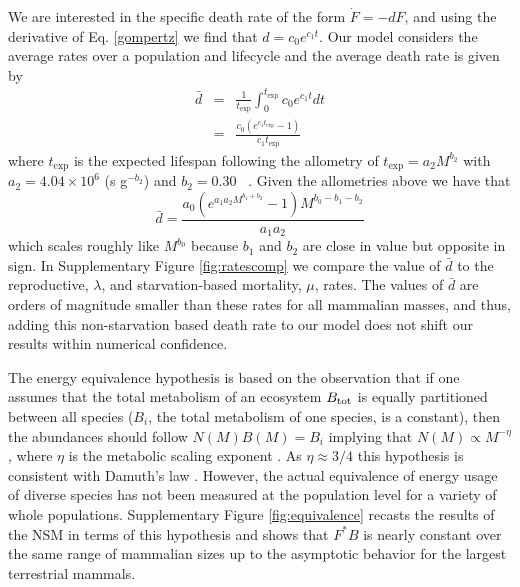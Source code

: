 \documentclass[onecolumn,preprintnumbers,amsmath,amssymb,superscriptaddress]{revtex4}
\begin{document}
We are interested in the specific death rate of the form $\dot{F}=-dF$, and using the derivative of Eq. \ref{gompertz} we find that $d=c_{0}e^{c_{1}t}$. Our model considers the average rates over a population and lifecycle and the average death rate is given by 
\begin{eqnarray}
\bar{d}&=&\frac{1}{t_{\text{exp}}}\int_{0}^{t_{\text{exp}}}c_{0}e^{c_{1}t} dt \\
&=&\frac{c_{0}\left(e^{c_{1} t_{\text{exp}}}-1\right)}{c_{1}t_{\text{exp}}}
\end{eqnarray}
where $t_{\text{exp}}$ is the expected lifespan following the allometry of $t_{\text{exp}}=a_{2}M^{b_{2}}$ with $a_{2}=4.04\times10^{6}$ (s g$^{-b_{2}}$) and $b_{2}=0.30$ ~\citep{damuth1982analysis,calder1984}. Given the allometries above we have that
\begin{equation}
\bar{d}=\frac{a_{0} \left(e^{a_{1}a_{2}M^{b_{1}+b_{2}}}-1\right) M^{b_{0}-b_{1}-b_{2}}}{a_{1} a_{2}}
\end{equation}
which scales roughly like $M^{b_{0}}$ because $b_{1}$ and $b_{2}$ are close in value but opposite in sign. In Supplementary Figure \ref{fig:ratescomp} we compare the value of $\bar{d}$ to the reproductive, $\lambda$, and starvation-based mortality, $\mu$, rates. The values of $\bar{d}$ are orders of magnitude smaller than these rates for all mammalian masses, and thus, adding this non-starvation based death rate to our model does not shift our results within numerical confidence.\\




The energy equivalence hypothesis is based on the observation that if one assumes that the total metabolism of an ecosystem $B_{\rm tot}$ is equally partitioned between all species ($B_{i}$, the total metabolism of one species, is a constant), then the abundances should follow $N\left(M\right)B\left(M\right)=B_{i}$ implying that $N\left(M\right)\propto M^{-\eta}$, where $\eta$ is the metabolic scaling exponent \citep{allen2002,enquist1998}. As $\eta \approx 3/4$ this hypothesis is consistent with Damuth's law \citep{allen2002}. 
However, the actual equivalence of energy usage of diverse species has not been measured at the population level for a variety of whole populations. Supplementary Figure \ref{fig:equivalence} recasts the results of the NSM in terms of this hypothesis and shows that $F^{*}B$ is nearly constant over the same range of mammalian sizes up to the asymptotic behavior for the largest terrestrial mammals.\\
\end{document}
